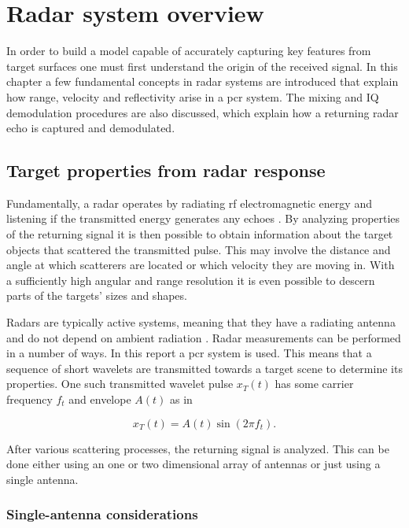 \chapter{Radar system overview}

In order to build a model capable of accurately capturing key features from target surfaces one must first understand the origin of the received signal. In this chapter a few fundamental concepts in radar systems are introduced that explain how range, velocity and reflectivity arise in a \gls{pcr} system. The mixing and IQ demodulation procedures are also discussed, which explain how a returning radar echo is captured and demodulated. 

\section{Target properties from radar response}
Fundamentally, a radar operates by radiating \gls{rf} electromagnetic energy and listening if the transmitted energy generates any echoes \citep{skolnik_2009}. By analyzing properties of the returning signal it is then possible to obtain information about the target objects that scattered the transmitted pulse. This may involve the distance and angle at which scatterers are located or which velocity they are moving in. With a sufficiently high angular and range resolution it is even possible to descern parts of the targets' sizes and shapes.  

Radars are typically active systems, meaning that they have a radiating antenna and do not depend on ambient radiation \citep{richards_2014}. Radar measurements can be performed in a number of ways. In this report a \gls{pcr} system is used. This means that a sequence of short wavelets are transmitted towards a target scene to determine its properties. One such transmitted wavelet pulse $x_T(t)$ has some carrier frequency $f_t$ and envelope $A(t)$ as in

\begin{equation}\label{eq:trans}
	x_T(t)
	= A(t)\sin(2\pi f_t).
\end{equation}

After various scattering processes, the returning signal is analyzed. This can be done either using an one or two dimensional array of antennas or just using a single antenna. 

\subsection{Single-antenna considerations}

